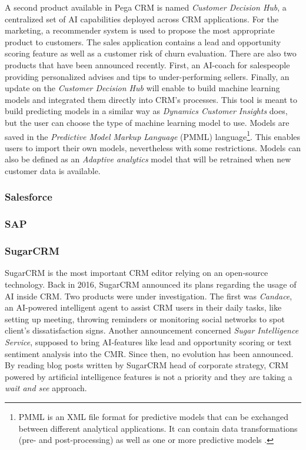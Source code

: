 A second product available in Pega CRM is named \textit{Customer Decision Hub}, a centralized set of AI capabilities deployed across CRM applications. For the marketing, a recommender system is used to propose the most appropriate product to customers. The sales application contains a lead and opportunity scoring feature as well as a customer risk of churn evaluation. There are also two products that have been announced recently. First, an AI-coach for salespeople providing personalized advises and tips to under-performing sellers. Finally, an update on the \textit{Customer Decision Hub} will enable to build machine learning models and integrated them directly into CRM's processes. This tool is meant to build predicting models in a similar way as \textit{Dynamics Customer Insights} does, but the user can choose the type of machine learning model to use. Models are saved in the \textit{Predictive Model Markup Language} (PMML) language\footnote{PMML is an XML file format for predictive models that can be exchanged between different analytical applications. It can contain data transformations (pre- and post-processing) as well as one or more predictive models \cite{pmml}.}. This enables users to import their own models, nevertheless with some restrictions. Models can also be defined as an \textit{Adaptive analytics} model that will be retrained when new customer data is available.

\subsubsection*{Salesforce}
\subsubsection*{SAP}


\subsubsection*{SugarCRM}
SugarCRM is the most important CRM editor relying on an open-source technology. Back in 2016, SugarCRM announced its plans regarding the usage of AI inside CRM. Two products were under investigation. The first was \textit{Candace}, an AI-powered intelligent agent to assist CRM users in their daily tasks, like setting up meeting, throwing reminders or monitoring social networks to spot client's dissatisfaction signs. Another announcement concerned \textit{Sugar Intelligence Service}, supposed to bring AI-features like lead and opportunity scoring or text sentiment analysis into the CMR. Since then, no evolution has been announced. By reading blog posts written by SugarCRM head of corporate strategy, CRM powered by artificial intelligence features is not a priority and they are taking a \textit{wait and see} approach.

